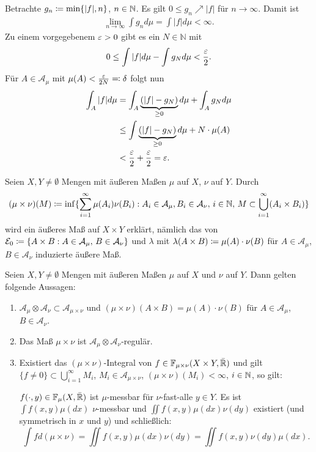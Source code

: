 \documentclass[a4paper,twoside,DIV15,BCOR12mm]{scrbook}
\newcommand{\A}{\mathcal A}
\begin{document}
\begin{beweis}
Betrachte $g_n\da \min\{|f|,n\}$, $n\in\mathbb{N}$. Es gilt $0\le g_n\nearrow |f|$ für $n\to\infty$. Damit ist
\begin{align*}
\lim_{n\to \infty} \int g_n d\mu = \int |f| d\mu <\infty.
\end{align*}
Zu einem vorgegebenem $\varepsilon>0$ gibt es ein $N\in\mathbb{N}$ mit 
\begin{align*}
0\le \int |f|d\mu - \int g_N d\mu < \frac{\varepsilon}2.
\end{align*}
Für $A\in\A_\mu$ mit $\mu(A) < \frac\ep{2N} \ad \delta$ folgt nun
\begin{align*}
\int_A |f| d\mu
&= \int_A\underbrace{(|f|-g_N)}_{\ge 0} d\mu + \int _A g_N d\mu \\
&\le \int\underbrace{(|f|-g_N)}_{\ge 0} d\mu + N \cdot \mu(A) \\
&< \frac{\varepsilon}2 + \frac{\varepsilon}2 = \varepsilon.
\end{align*}
\end{beweis}

Seien $X,Y\neq\emptyset$ Mengen mit äußeren Maßen $\mu$ auf $X$, $\nu$ auf $Y$. Durch
\[
(\mu \times \nu)(M) \da \inf\{ \sum_{i=1}^\infty \mu(A_i)\nu(B_i): A_i\in \A_\mu, B_i\in \A_\nu,\, i\in\MdN,\, M\subset \bigcup_{i=1}^\infty (A_i \times B_i)\}
\]
wird ein äußeres Maß auf $X\times Y$ erklärt, nämlich das von $\mathcal E_0 \da \{A \times B : A\in\A_\mu,\, B\in\A_\nu\}$ und $\lambda$ mit $\lambda(A\times B) \da \mu(A)\cdot \nu(B)$ für $A\in\A_\mu$, $B\in\A_\nu$ induzierte äußere Maß.

\begin{satz}[Fubini]
Seien $X,Y\ne \emptyset$ Mengen mit äußeren Maßen $\mu$ auf $X$ und $\nu$ auf $Y$. Dann gelten folgende Aussagen:
\begin{enumerate}
\item $\A_\mu \otimes \A_\nu \subset \A_{\mu\times \nu}$ und $(\mu\times \nu)(A\times B) = \mu(A) \cdot \nu(B)$ für $A\in\A_\mu$, $B\in\A_\nu$.
\item Das Maß $\mu\times\nu$ ist $\A_\mu \otimes \A_\nu$-regulär.
\item Existiert das $(\mu \times \nu)$-Integral von $f\in\mathbb F_{\mu\times\nu}(X\times Y,\bar{\mathbb{R}})$ und gilt $\{f\ne 0\}\subset \bigcup_{i=1}^\infty M_i$, $M_i\in\A_{\mu\times\nu}$, $(\mu\times\nu)(M_i)<\infty$, $i\in\mathbb{N}$, so gilt:

$f(\cdot,y) \in\mathbb F_\mu(X,\bar{\mathbb{R}})$ ist $\mu$-messbar für $\nu$-fast-alle $y\in Y$. Es ist $\int f(x,y)\mu(dx)$ $\nu$-messbar und $\iint f(x,y)\mu(dx)\nu(dy)$ existiert (und symmetrisch in $x$ und $y$) und schließlich:
\[
\int f d(\mu\times\nu) = \iint f(x,y)\mu(dx)\nu(dy) = \iint f(x,y) \nu(dy) \mu(dx).
\]
\end{enumerate}
\end{satz}
\end{document}
